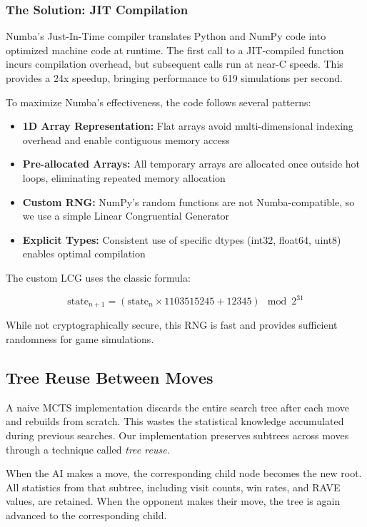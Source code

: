 \documentclass[11pt]{article}
\begin{document}
\subsubsection{The Solution: JIT Compilation}

Numba's Just-In-Time compiler translates Python and NumPy code into optimized machine code at runtime. The first call to a JIT-compiled function incurs compilation overhead, but subsequent calls run at near-C speeds. This provides a 24x speedup, bringing performance to 619 simulations per second.

To maximize Numba's effectiveness, the code follows several patterns:

\begin{itemize}
    \item \textbf{1D Array Representation:} Flat arrays avoid multi-dimensional indexing overhead and enable contiguous memory access
    \item \textbf{Pre-allocated Arrays:} All temporary arrays are allocated once outside hot loops, eliminating repeated memory allocation
    \item \textbf{Custom RNG:} NumPy's random functions are not Numba-compatible, so we use a simple Linear Congruential Generator
    \item \textbf{Explicit Types:} Consistent use of specific dtypes (int32, float64, uint8) enables optimal compilation
\end{itemize}

The custom LCG uses the classic formula:

\begin{equation}
    \text{state}_{n+1} = (\text{state}_n \times 1103515245 + 12345) \mod 2^{31}
\end{equation}

While not cryptographically secure, this RNG is fast and provides sufficient randomness for game simulations.

\subsection{Tree Reuse Between Moves}

A naive MCTS implementation discards the entire search tree after each move and rebuilds from scratch. This wastes the statistical knowledge accumulated during previous searches. Our implementation preserves subtrees across moves through a technique called \textit{tree reuse}.

When the AI makes a move, the corresponding child node becomes the new root. All statistics from that subtree, including visit counts, win rates, and RAVE values, are retained. When the opponent makes their move, the tree is again advanced to the corresponding child.
\end{document}
